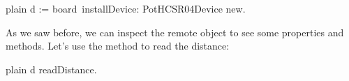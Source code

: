 \documentclass[10pt,twoside,english]{_support/latex/sbabook/sbabook}
\begin{document}
\begin{displaycode}{plain}
d := board installDevice: PotHCSR04Device new. ​ 
\end{displaycode}

As we saw before, we can inspect the remote object to see some properties and methods. Let's use the method  to read the distance: 

\begin{displaycode}{plain}
d readDistance.  
\end{displaycode}


\backmatter

\end{document}

